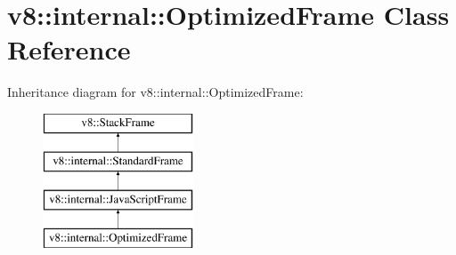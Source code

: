 \hypertarget{classv8_1_1internal_1_1_optimized_frame}{}\section{v8\+:\+:internal\+:\+:Optimized\+Frame Class Reference}
\label{classv8_1_1internal_1_1_optimized_frame}
Inheritance diagram for v8\+:\+:internal\+:\+:Optimized\+Frame\+:\begin{figure}[H]
\begin{center}
\leavevmode
\includegraphics[height=4.000000cm]{classv8_1_1internal_1_1_optimized_frame}
\end{center}
\end{figure}
